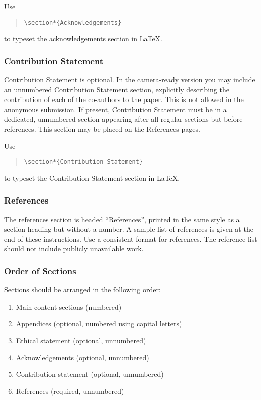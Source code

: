 \documentclass{article}
\begin{document}
Use
\begin{quote}
    {\tt \textbackslash{}section*\{Acknowledgements\}}
\end{quote}
to typeset the acknowledgements section in \LaTeX{}.


\subsubsection{Contribution Statement}

Contribution Statement is optional. In the camera-ready version you may include an unnumbered Contribution Statement section, explicitly describing the contribution of each of the co-authors to the paper. This is not allowed in the anonymous submission. If present, Contribution Statement must be in a dedicated, unnumbered section appearing after all regular sections but before references.  This section may be placed on the References pages.

Use
\begin{quote}
    {\tt \textbackslash{}section*\{Contribution Statement\}}
\end{quote}
to typeset the Contribution Statement section in \LaTeX{}.

\subsubsection{References}

The references section is headed ``References'', printed in the same
style as a section heading but without a number. A sample list of
references is given at the end of these instructions. Use a consistent
format for references. The reference list should not include publicly unavailable work.

\subsubsection{Order of Sections}
Sections should be arranged in the following order:
\begin{enumerate}
    \item Main content sections (numbered)
    \item Appendices (optional, numbered using capital letters)
    \item Ethical statement (optional, unnumbered)
    \item Acknowledgements (optional, unnumbered)
    \item Contribution statement (optional, unnumbered)
    \item References (required, unnumbered)
\end{enumerate}
\end{document}
